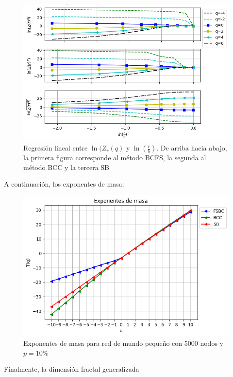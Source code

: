 \begin{figure}[H]
    \centering
    \includegraphics[scale=0.7]{Capitulo4Multifractalidad/imagenes/a_TqLnrBCsmallWorld4000p10.png}
    \caption{Regresión lineal entre $\ln(Z_r(q)$ y $\ln(\frac{r}{b})$. De arriba hacia abajo, la primera figura corresponde al método BCFS, la segunda al método BCC y la tercera SB}
\end{figure}

A continuación, los exponentes de masa:


\begin{figure}[H]
    \centering
    \includegraphics[scale=0.7]{Capitulo4Multifractalidad/imagenes/a_TqsmallWorld4000p10.png}
    \caption{Exponentes de masa para red de mundo pequeño con 5000 nodos y $p=10\%$}
\end{figure}

Finalmente, la dimensión fractal generalizada


